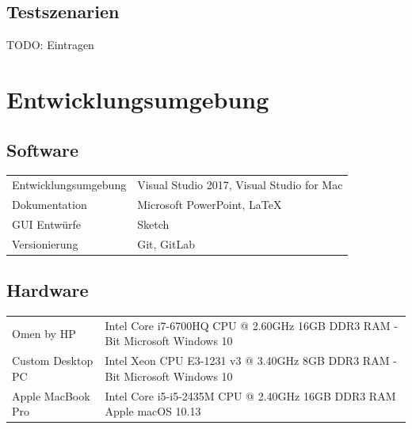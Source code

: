 \documentclass[a4paper]{scrreprt}
\begin{document}
\section{Testszenarien}
TODO: Eintragen
 

\chapter{Entwicklungsumgebung}
 
\section{Software}
\begin{tabular}{lll}
Entwicklungsumgebung &  \multicolumn{2}{p{12cm}}{Visual Studio 2017, Visual Studio for Mac}\\
Dokumentation &  \multicolumn{2}{p{12cm}}{Microsoft PowerPoint, LaTeX}  \\
GUI Entwürfe & \multicolumn{2}{p{12cm}}{Sketch} \\
Versionierung & \multicolumn{2}{p{12cm}}{Git, GitLab} \\
\end{tabular}

 
\section{Hardware}
\begin{tabular}{lll}
Omen by HP &  \multicolumn{2}{p{12cm}}{Intel Core i7-6700HQ CPU @ 2.60GHz \newline 16GB DDR3 RAM  \newline 64-Bit Microsoft Windows 10}\\
Custom Desktop PC &  \multicolumn{2}{p{12cm}}{Intel Xeon CPU E3-1231 v3 @ 3.40GHz \newline 8GB DDR3 RAM  \newline 64-Bit Microsoft Windows 10}\\
Apple MacBook Pro &  \multicolumn{2}{p{12cm}}{Intel Core i5-i5-2435M CPU @ 2.40GHz \newline 16GB DDR3 RAM  \newline Apple macOS 10.13}\\
\end{tabular}
 
 
\printnoidxglossaries

\listoffigures
 
\end{document}
